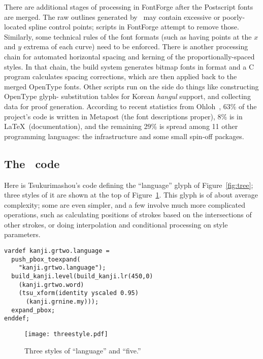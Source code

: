 \documentclass{ltugboat}
\begin{document}
There are additional stages of processing in
\linebreak%
 FontForge after the Postscript
fonts are merged. $\!$The raw outlines generated by \MF\ may contain excessive
or poorly-located spline control points;
\linebreak%
 scripts in FontForge attempt to
remove those.  Similarly, some technical rules of the font formats (such as
having points at the $x$ and $y$ extrema of each curve) need to be enforced. 
There is another processing chain for automated horizontal spacing and
kerning of the proportionally-spaced styles.  In that chain, the build
system generates bitmap fonts in  format and a C program
calculates spacing corrections, which are then applied back to the merged
OpenType fonts.  Other scripts run on the side do things like constructing
OpenType glyph-
\linebreak%
substitution tables for Korean \emph{hangul} support, and
collecting data for proof generation.  According to recent statistics from
Ohloh~\cite{Ohloh:Languages}, 63\% of the project's code is written in
Metapost (the font descriptions proper), 8\% is in \LaTeX\ (documentation),
and the remaining 29\% is spread among 11 other programming languages: the
infrastructure and some small spin-off packages.

\subsection{The \MF\ code}

Here is Tsukurimashou's code defining the
\linebreak%
 ``language''
glyph of Figure~\ref{fig:tree}; three styles of it are shown at the top of
Figure~\ref{fig:threestyle}.  This glyph is of about
average complexity; some are even simpler, and a few involve much more
complicated operations, such as calculating positions of strokes based on
the intersections of other strokes, or doing interpolation and conditional
processing on style parameters.

\begin{verbatim}
vardef kanji.grtwo.language =
  push_pbox_toexpand(
    "kanji.grtwo.language");
  build_kanji.level(build_kanji.lr(450,0)
    (kanji.grtwo.word)
    (tsu_xform(identity yscaled 0.95)
      (kanji.grnine.my)));
  expand_pbox;
enddef;
\end{verbatim}

\begin{figure}
\texttt{[image: threestyle.pdf]}
\caption{Three styles of ``language'' and ``five.''}
\label{fig:threestyle}
\vskip-2mm%
\end{figure}
\end{document}
